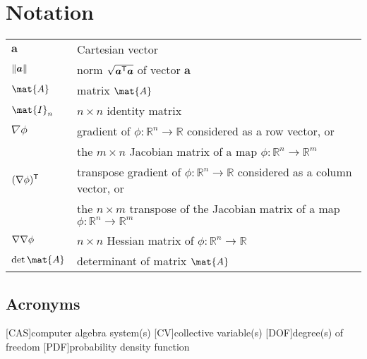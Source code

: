
\chapter*{Notation}

\begin{tabular}{ll}
  $\bm{a}$     & Cartesian vector\\
  $\lVert\bm{a}\rVert$ & norm $\sqrt{\bm{a}^\mathsf{T}\bm{a}}$ of vector $\bm{a}$\\
  $\mat{A}$ & matrix $\mat{A}$\\
  $\mat{I}_n$ & $n\times n$ identity matrix\\
  $\nabla \phi$ & gradient of $\phi: \mathbb{R}^n \to \mathbb{R}$ considered as a row vector, or\\
                & the $m\times n$ Jacobian matrix of a map $\phi: \mathbb{R}^n \to \mathbb{R}^m$\\
  $(\nabla\phi)^\mathsf{T}$ & transpose gradient of $\phi: \mathbb{R}^n \to \mathbb{R}$ considered as a column vector, or\\
                & the $n\times m$ transpose of the Jacobian matrix of a map $\phi: \mathbb{R}^n \to \mathbb{R}^m$\\
  $\nabla\nabla \phi$ & $n\times n$ Hessian matrix of $\phi: \mathbb{R}^n \to \mathbb{R}$\\
  $\det\mat{A}$ & determinant of matrix $\mat{A}$\\
\end{tabular}

\section*{Acronyms}

\def\aclabelfont#1{\textsf{\textsc{\MakeLowercase{#1}}}}
\begin{acronym}\itemsep0pt
  [CAS]{computer algebra system(s)}
  [CV]{collective variable(s)}
  [DOF]{degree(s) of freedom}
  [PDF]{probability density function}
\end{acronym}
